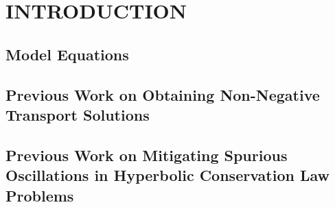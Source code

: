 \chapter{INTRODUCTION}


\section{Model Equations\label{sec:model_equations_intro}}
  
\section{Previous Work on Obtaining Non-Negative Transport Solutions
  \label{sec:positive_transport}}
  
\section{Previous Work on Mitigating Spurious Oscillations in Hyperbolic
  Conservation Law Problems
  \label{sec:hyperbolic_intro}}
  
